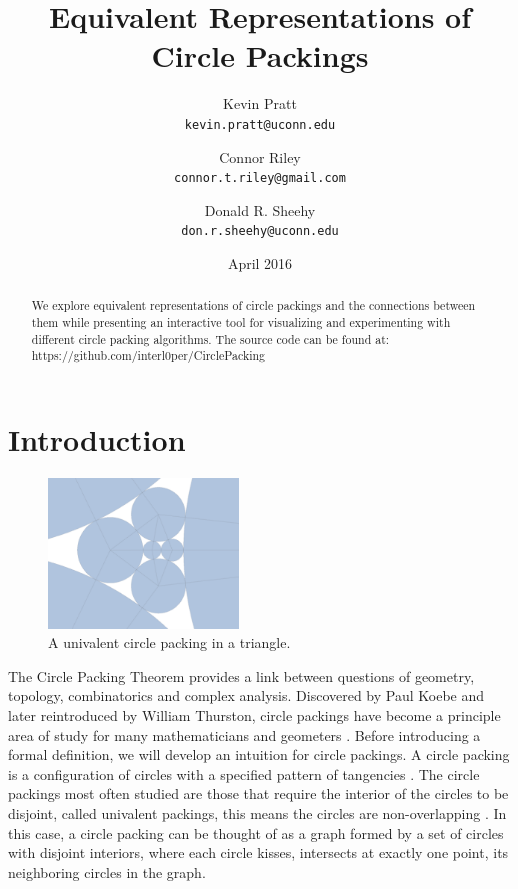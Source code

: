\documentclass[11pt]{article}
\title{Equivalent Representations of Circle Packings}
\author{
  Kevin Pratt\\
  \texttt{kevin.pratt@uconn.edu}
  \and
  Connor Riley\\
  \texttt{connor.t.riley@gmail.com}
    \and
  Donald R. Sheehy\\
  \texttt{don.r.sheehy@uconn.edu}
}\date{April 2016}
\theoremstyle{definition}
\begin{document}
\maketitle

\begin{abstract}
  We explore equivalent representations of circle packings and the connections between them while presenting an interactive tool for visualizing and experimenting with different circle packing algorithms. 
  The source code can be found at: https://github.com/interl0per/CirclePacking
\end{abstract}

\section{Introduction}

\begin{figure}
  \begin{center}
    \includegraphics[scale=.18,width=0.45\textwidth]{circlepacking_1}
  \end{center}
  \caption{A univalent circle packing in a triangle.}
\end{figure}

The Circle Packing Theorem provides a link between questions of geometry, topology, combinatorics and complex analysis. Discovered by Paul Koebe and later reintroduced by William Thurston, circle packings have become a principle area of study for many mathematicians and geometers \cite{wilkerson}. Before introducing a formal definition, we will develop an intuition for circle packings. A circle packing is a configuration of circles with a specified pattern of tangencies \cite{stephenson05introduction}. The circle packings most often studied are those that require the interior of the circles to be disjoint, called univalent packings, this means the circles are non-overlapping \cite{stephenson05introduction}. In this case, a circle packing can be thought of as a graph formed by a set of circles with disjoint interiors, where each circle kisses, intersects at exactly one point, its neighboring circles in the graph.
\end{document}
